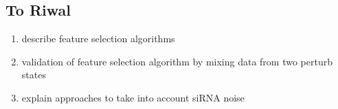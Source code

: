 \subsection{To Riwal}
\begin{enumerate}
\item describe feature selection algorithms
\item validation of feature selection algorithm by mixing data from two perturb states
\item explain approaches to take into account siRNA noise
\end{enumerate}
